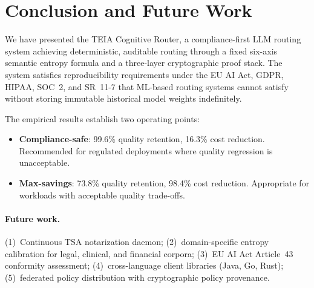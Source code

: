 \documentclass[11pt,a4paper]{article}
\newcommand{\teia}{\textsc{TEIA}}
\begin{document}
\section{Conclusion and Future Work}

We have presented the \teia{} Cognitive Router, a compliance-first LLM routing
system achieving deterministic, auditable routing through a fixed six-axis semantic
entropy formula and a three-layer cryptographic proof stack. The system satisfies
reproducibility requirements under the EU AI Act, GDPR, HIPAA, SOC~2, and SR~11-7
that ML-based routing systems cannot satisfy without storing immutable historical
model weights indefinitely.

The empirical results establish two operating points:
\begin{itemize}
  \item \textbf{Compliance-safe}: 99.6\% quality retention, 16.3\% cost reduction.
    Recommended for regulated deployments where quality regression is unacceptable.
  \item \textbf{Max-savings}: 73.8\% quality retention, 98.4\% cost reduction.
    Appropriate for workloads with acceptable quality trade-offs.
\end{itemize}

\paragraph{Future work.}
(1)~Continuous TSA notarization daemon; (2)~domain-specific entropy calibration
for legal, clinical, and financial corpora; (3)~EU AI Act Article~43 conformity
assessment; (4)~cross-language client libraries (Java, Go, Rust); (5)~federated
policy distribution with cryptographic policy provenance.
\end{document}
